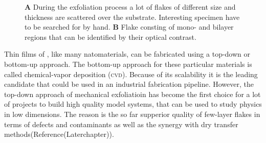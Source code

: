 \begin{figure}
\begin{subfigure}{0.349\textwidth}
\end{subfigure}
\caption{\textbf{A} During the exfoliation process a lot of flakes of different size and thickness are scattered over the substrate. Interesting specimen have to be searched for by hand. \textbf{B} Flake consting of mono- and bilayer regions that can be identified by their optical contrast.}
	\label{flakes}
\end{figure}
Thin films of \tmds\!, like many natomaterials, can be fabricated using a top-down or bottom-up approach. The bottom-up approach for these particular materials is called chemical-vapor deposition (\textsc{cvd})\cite{chen_chemical_2016}. Because of its scalability it is the leading candidate that could be used in an industrial fabrication pipeline. However, the top-down approach of mechanical exfoliatioin has become the first choice for a lot of projects to build high quality model systems, that can be used to study physics in low dimensions\cite{geim_rise_2007}. The reason is the so far supperior quality of few-layer flakes in terms of defects and contaminants as well as the synergy with dry transfer methods(Reference(Laterchapter)). 

